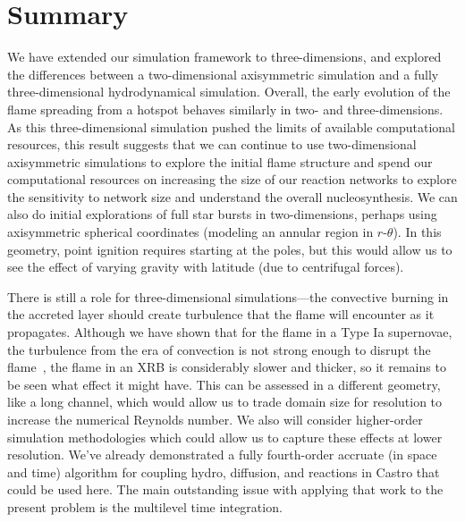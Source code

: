 \documentclass[twocolumn,times,tighten]{aastex631}
\begin{document}
\section{Summary}

We have extended our simulation framework to three-dimensions, and
explored the differences between a two-dimensional axisymmetric
simulation and a fully three-dimensional hydrodynamical simulation.
Overall, the early evolution of the flame spreading from a hotspot
behaves similarly in two- and three-dimensions.  As this
three-dimensional simulation pushed the limits of available
computational resources, this result suggests that we can continue to
use two-dimensional axisymmetric simulations to explore the initial
flame structure and spend our computational resources on increasing
the size of our reaction networks to explore the sensitivity to
network size and understand the overall nucleosynthesis.  We can also
do initial explorations of full star bursts in two-dimensions, perhaps
using axisymmetric spherical coordinates (modeling an annular region
in $r$-$\theta$).  In this geometry, point ignition requires starting
at the poles, but this would allow us to see the effect of varying
gravity with latitude (due to centrifugal forces).

There is still a role for three-dimensional simulations---the
convective burning in the accreted layer should create turbulence that
the flame will encounter as it propagates.  Although we have shown
that for the flame in a Type Ia supernovae, the turbulence from the
era of convection is not strong enough to disrupt the
flame~\citep{wdturb}, the flame in an XRB is considerably slower and
thicker, so it remains to be seen what effect it might have.  This can
be assessed in a different geometry, like a long channel, which would
allow us to trade domain size for resolution to increase the numerical
Reynolds number.  We also will consider higher-order simulation
methodologies which could allow us to capture these effects at lower
resolution.  We've already demonstrated a fully fourth-order accruate
(in space and time) algorithm for coupling hydro, diffusion, and
reactions in Castro \citep{castro-sdc} that could be used here.  The
main outstanding issue with applying that work to the present problem
is the multilevel time integration.
\end{document}
